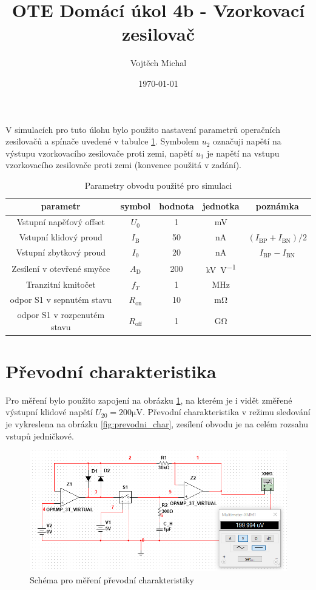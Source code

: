 \documentclass[twoside]{article}
\title{OTE Domácí úkol 4b - Vzorkovací zesilovač}
\author{Vojtěch Michal}
\date{\today}
\begin{document}
\maketitle

V simulacích pro tuto úlohu bylo použito nastavení parametrů operačních zesilovačů a spínače uvedené v tabulce \ref{tab:oz_param}.
Symbolem $u_2$ označuji napětí na výstupu vzorkovacího zesilovače proti zemi,
napětí $u_1$ je napětí na vstupu vzorkovacího zesilovače proti zemi
(konvence použitá v zadání).

\begin{table}[h!]
    \centering
    \begin{tabular}{c|c|c|c|c}
        parametr & symbol & hodnota & jednotka & poznámka\\
        \hline
        Vstupní napěťový offset & $U_0$ & 1 & \si{\milli\volt} & \\
        Vstupní klidový proud & $I_\text{B}$ & 50 & \si{\nano\ampere} & $(I_\text{BP} + I_\text{BN})/2$ \\
        Vstupní zbytkový proud & $I_0$ & 20 & \si{\nano\ampere} & $I_\text{BP} - I_\text{BN}$ \\
        Zesílení v otevřené smyčce & $A_\text{D}$ & 200 & \si{\kilo\volt\per\volt} & \\
        Tranzitní kmitočet& $f_T$ & 1 & \si{\mega\hertz} & \\
        odpor S1 v sepnutém stavu & $R_\text{on}$ & 10 & \si{\milli\ohm} & \\
        odpor S1 v rozpenutém stavu & $R_\text{off}$ & 1 & \si{\giga\ohm} & \\
    \end{tabular}
    \caption{Parametry obvodu použité pro simulaci}
    \label{tab:oz_param}
\end{table}

\section{Převodní charakteristika}

Pro měření bylo použito zapojení na obrázku \ref{fig:prevodni_char_schema},
na kterém je i vidět změřené výstupní klidové napětí $U_{20} = 200 \si{\micro\volt}$.
Převodní charakteristika v režimu sledování je vykreslena na obrázku \ref{fig:prevodni_char},
zesílení obvodu je na celém rozsahu vstupů jedničkové.


\begin{figure}[h!]
    \centering
    \includegraphics[width=0.65\linewidth]{zbytkove_vystup.png}
    \caption{Schéma pro měření převodní charakteristiky}
    \label{fig:prevodni_char_schema}
\end{figure}
\end{document}
